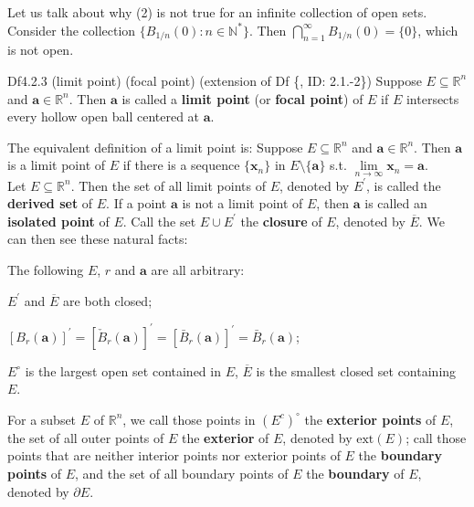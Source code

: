\documentclass{article}
\begin{document}
\begin{Rmk}{}
    Let us talk about why (2) is not true for an infinite collection of open sets. Consider the collection $\{B_{1/n}(0): n\in\mathbb{N}^\ast\}$. Then $\bigcap\limits_{n=1}^\infty B_{1/n}(0) = \{0\}$, which is not open.
\end{Rmk}

\begin{Df}{Df4.2.3 (limit point) (focal point) (extension of Df \{, ID: 2.1.-2\})}
    Suppose $E\subseteq\mathbb{R}^n$ and $\pmb{a}\in\mathbb{R}^n$. Then $\pmb{a}$ is called a \textbf{limit point} (or \textbf{focal point}) of $E$ if $E$ intersects every hollow open ball centered at $\pmb{a}$.
\end{Df}
    
\begin{Rmk}{}
    The equivalent definition of a limit point is: \textcolor{Df}{Suppose $E\subseteq\mathbb{R}^n$ and $\pmb{a}\in\mathbb{R}^n$. Then $\pmb{a}$ is a limit point of $E$ if there is a sequence $\{\pmb{x}_n\}$ in $E\setminus\{\pmb{a}\}$ s.t. $\lim\limits_{n\to\infty} \pmb{x}_n = \pmb{a}$.}\\
    \textcolor{Df}{Let $E\subseteq\mathbb{R}^n$. Then the set of all limit points of $E$, denoted by $E^\prime$, is called the \textbf{derived set} of $E$. If a point $\pmb{a}$ is not a limit point of $E$, then $\pmb{a}$ is called an \textbf{isolated point} of $E$. Call the set $E\cup E^\prime$ the \textbf{closure} of $E$, denoted by $\overline{E}$.} We can then see these natural facts: 
    \textcolor{Th}{The following $E$, $r$ and $\pmb{a}$ are all arbitrary:
    \begin{compactenum}
        \item $E^\prime$ and $\overline{E}$ are both closed;
        \item $[B_r(\pmb{a})]^\prime = [\check{B}_r(\pmb{a})]^\prime = [\bar{B}_r(\pmb{a})]^\prime = \bar{B}_r(\pmb{a})$;
        \item $E^\circ$ is the largest open set contained in $E$, $\overline{E}$ is the smallest closed set containing $E$.
    \end{compactenum}}
    \textcolor{Df}{For a subset $E$ of $\mathbb{R}^n$, we call those points in $(E^c)^\circ$ the \textbf{exterior points} of $E$, the set of all outer points of $E$ the \textbf{exterior} of $E$, denoted by $\text{ext}(E)$; call those points that are neither interior points nor exterior points of $E$ the \textbf{boundary points} of $E$, and the set of all boundary points of $E$ the \textbf{boundary} of $E$, denoted by $\partial E$.} 
\end{Rmk}
\end{document}
